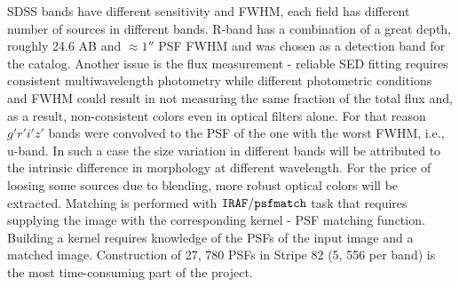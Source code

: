 \documentclass[numberedappendix,apj,twocolumn]{emulateapj}
\begin{document}
SDSS bands have different sensitivity and FWHM, each field has different number of sources in different bands. R-band has a combination of a great depth, roughly 24.6 AB and $\approx1''$ PSF FWHM and was chosen as a detection band for the catalog.
Another issue is the flux measurement - reliable SED fitting requires consistent multiwavelength photometry while different photometric conditions and FWHM could result in not measuring the same fraction of the total flux and, as a result, non-consistent colors even in optical filters alone. 
For that reason $g' r' i' z'$ bands were convolved to the PSF of the one with the worst FWHM, i.e., u-band. In such a case the size variation in different bands will be attributed to the intrinsic difference in morphology at different wavelength. For the price of loosing some sources due to blending, more robust optical colors will be extracted. Matching is performed with $\tt IRAF/psfmatch$ task that requires supplying the image with the corresponding kernel - PSF matching function. Building a kernel requires  knowledge of the PSFs of the input image and a matched image. Construction of 27, 780 PSFs in Stripe 82 (5, 556 per band) is the most time-consuming part of the project.
\end{document}
